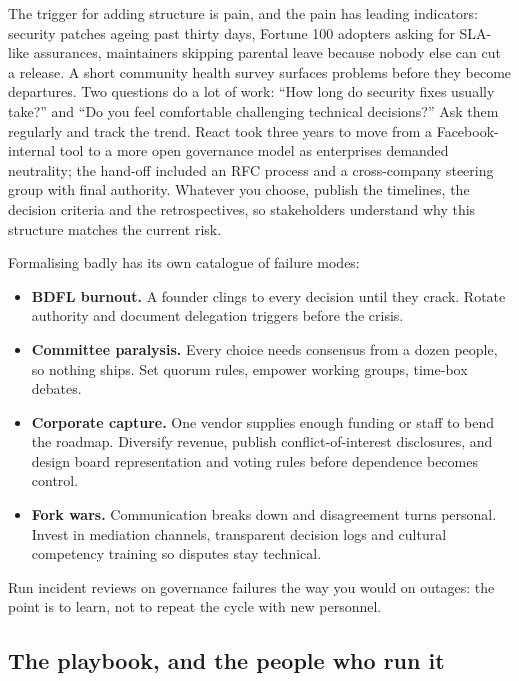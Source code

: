 The trigger for adding structure is pain, and the pain has leading indicators: security patches ageing past thirty days, Fortune 100 adopters asking for SLA-like assurances, maintainers skipping parental leave because nobody else can cut a release. A short community health survey surfaces problems before they become departures. Two questions do a lot of work: ``How long do security fixes usually take?'' and ``Do you feel comfortable challenging technical decisions?'' Ask them regularly and track the trend. React took three years to move from a Facebook-internal tool to a more open governance model as enterprises demanded neutrality; the hand-off included an RFC process and a cross-company steering group with final authority. Whatever you choose, publish the timelines, the decision criteria and the retrospectives, so stakeholders understand why this structure matches the current risk.


Formalising badly has its own catalogue of failure modes:


\begin{itemize}[leftmargin=*]
\item \textbf{BDFL burnout.} A founder clings to every decision until they crack. Rotate authority and document delegation triggers before the crisis.
\item \textbf{Committee paralysis.} Every choice needs consensus from a dozen people, so nothing ships. Set quorum rules, empower working groups, time-box debates.
\item \textbf{Corporate capture.} One vendor supplies enough funding or staff to bend the roadmap. Diversify revenue, publish conflict-of-interest disclosures, and design board representation and voting rules before dependence becomes control.
\item \textbf{Fork wars.} Communication breaks down and disagreement turns personal. Invest in mediation channels, transparent decision logs and cultural competency training so disputes stay technical.
\end{itemize}

Run incident reviews on governance failures the way you would on outages: the point is to learn, not to repeat the cycle with new personnel.



\subsection{The playbook, and the people who run it}


